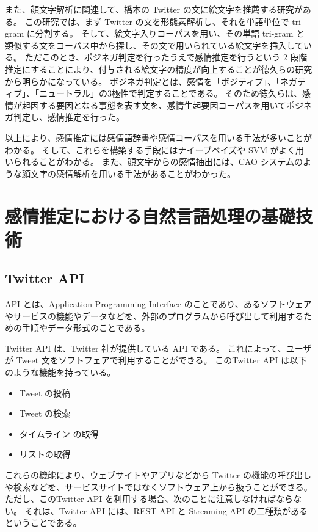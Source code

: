 \documentclass[11pt,a4j]{jsarticle}
\begin{document}
また、顔文字解析に関連して、橋本の Twitter の文に絵文字を推薦する研究がある。
この研究では、まず Twitter の文を形態素解析し、それを単語単位で tri-gram に分割する。
そして、絵文字入りコーパスを用い、その単語 tri-gram と類似する文をコーパス中から探し、その文で用いられている絵文字を挿入している。
ただこのとき、ポジネガ判定を行ったうえで感情推定を行うという 2 段階推定にすることにより、付与される絵文字の精度が向上することが徳久らの研究から明らかになっている。
ポジネガ判定とは、感情を「ポジティブ」、「ネガティブ」、「ニュートラル」の3極性で判定することである。
そのため徳久らは、感情が起因する要因となる事態を表す文を、感情生起要因コーパスを用いてポジネガ判定し、感情推定を行った。

以上により、感情推定には感情語辞書や感情コーパスを用いる手法が多いことがわかる。
そして、これらを構築する手段にはナイーブベイズや SVM がよく用いられることがわかる。
また、顔文字からの感情抽出には、CAO システムのような顔文字の感情解析を用いる手法があることがわかった。

\section{感情推定における自然言語処理の基礎技術}\label{sec:tools}
\subsection{Twitter API}
API とは、Application Programming Interface のことであり、あるソフトウェアやサービスの機能やデータなどを、外部のプログラムから呼び出して利用するための手順やデータ形式のことである。

Twitter API は、Twitter 社が提供している API である。
これによって、ユーザが Tweet 文をソフトフェアで利用することができる。
このTwitter API は以下のような機能を持っている。

\begin{itemize}
  \item Tweet の投稿
  \item Tweet の検索
  \item タイムライン の取得
  \item リストの取得
\end{itemize}
これらの機能により、ウェブサイトやアプリなどから Twitter の機能の呼び出しや検索などを、サービスサイトではなくソフトウェア上から扱うことができる。
ただし、このTwitter API を利用する場合、次のことに注意しなければならない。
それは、Twitter API には、REST API と Streaming API の二種類があるということである。
\end{document}
